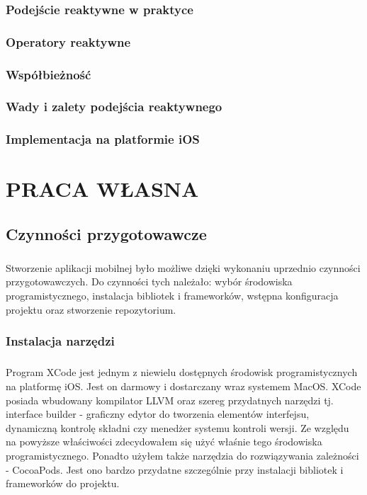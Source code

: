\documentclass[11pt,twoside,a4paper]{report}
\begin{document}
\subsection{Podejście reaktywne w praktyce}
\subsection{Operatory reaktywne}
\subsection{Współbieżność}
\subsection{Wady i zalety podejścia reaktywnego} 
\subsection{Implementacja na platformie iOS}
\chapter{PRACA WŁASNA}
\section{Czynności przygotowawcze}		
\paragraph{}Stworzenie aplikacji mobilnej było możliwe dzięki wykonaniu uprzednio czynności przygotowawczych. Do czynności tych należało: wybór środowiska programistycznego, instalacja bibliotek i frameworków, wstępna konfiguracja projektu oraz stworzenie repozytorium.
\subsection{Instalacja narzędzi}
\paragraph{}Program XCode jest jednym z niewielu dostępnych środowisk programistycznych na platformę iOS. Jest on darmowy i dostarczany wraz systemem MacOS. XCode posiada wbudowany kompilator LLVM oraz szereg przydatnych narzędzi tj. interface builder - graficzny edytor do tworzenia elementów interfejsu, dynamiczną kontrolę składni czy menedżer systemu kontroli wersji. Ze względu na powyższe właściwości zdecydowałem się użyć właśnie tego środowiska programistycznego.
Ponadto użyłem także narzędzia do rozwiązywania zależności - CocoaPods. Jest ono bardzo przydatne szczególnie przy instalacji bibliotek i frameworków do projektu.  
\end{document}
